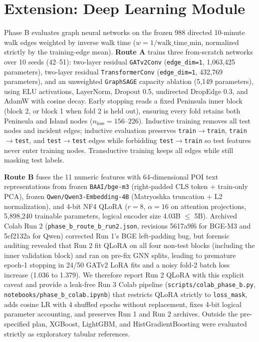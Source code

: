 \documentclass[11pt,a4paper]{article}
\begin{document}
\section{Extension: Deep Learning Module}
Phase B evaluates graph neural networks on the frozen 988 directed 10-minute walk edges weighted by inverse walk time (\(w = 1/\mathrm{walk\_time\_min}\), normalized strictly by the training-edge mean). \textbf{Route A} trains three from-scratch networks over 10 seeds (42--51): two-layer residual \texttt{GATv2Conv} \citep{brody2022} (\texttt{edge\_dim=1}, 1,063,425 parameters), two-layer residual \texttt{TransformerConv} \citep{shi2021} (\texttt{edge\_dim=1}, 432,769 parameters), and an unweighted \texttt{GraphSAGE} capacity ablation \citep{hamilton2017} (5,149 parameters), using ELU activations, LayerNorm, Dropout 0.5, undirected DropEdge 0.3, and AdamW with cosine decay. Early stopping reads a fixed Peninsula inner block (block 2, or block 1 when fold 2 is held out), ensuring every fold retains both Peninsula and Island nodes (\(n_{\mathrm{loss}} = 156\text{--}226\)). Inductive training removes all test nodes and incident edges; inductive evaluation preserves \texttt{train}\(\to\)\texttt{train}, \texttt{train}\(\to\)\texttt{test}, and \texttt{test}\(\to\)\texttt{test} edges while forbidding \texttt{test}\(\to\)\texttt{train} so test features never enter training nodes. Transductive training keeps all edges while still masking test labels.

\textbf{Route B} fuses the 11 numeric features with 64-dimensional POI text representations from frozen \texttt{BAAI/bge-m3} (right-padded CLS token + train-only PCA), frozen \texttt{Qwen/Qwen3-Embedding-4B} (Matryoshka truncation + L2 normalization), and 4-bit NF4 QLoRA \citep{dettmers2023} (\(r=8\), \(\alpha=16\) on attention projections, 5,898,240 trainable parameters, logical encoder size 4.03B \(\le\) 5B). Archived Colab Run 2 (\texttt{phase\_b\_route\_b\_run2.json}, revisions {\ttfamily 5617a9f6} for BGE-M3 and {\ttfamily 5cf2132a} for Qwen) corrected Run 1's BGE left-padding bug, but forensic auditing revealed that Run 2 fit QLoRA on all four non-test blocks (including the inner validation block) and ran on pre-fix GNN splits, leading to premature epoch-1 stopping in 24/50 GATv2 LoRA fits and a noisy fold-2 batch loss increase (1.036 to 1.379). We therefore report Run 2 QLoRA with this explicit caveat and provide a leak-free Run 3 Colab pipeline (\texttt{scripts/colab\_phase\_b.py}, \texttt{notebooks/phase\_b\_colab.ipynb}) that restricts QLoRA strictly to \texttt{loss\_mask}, adds cosine LR with 4 shuffled epochs without replacement, fixes 4-bit logical parameter accounting, and preserves Run 1 and Run 2 archives. Outside the pre-specified plan, XGBoost, LightGBM, and HistGradientBoosting were evaluated strictly as exploratory tabular references.
\end{document}
